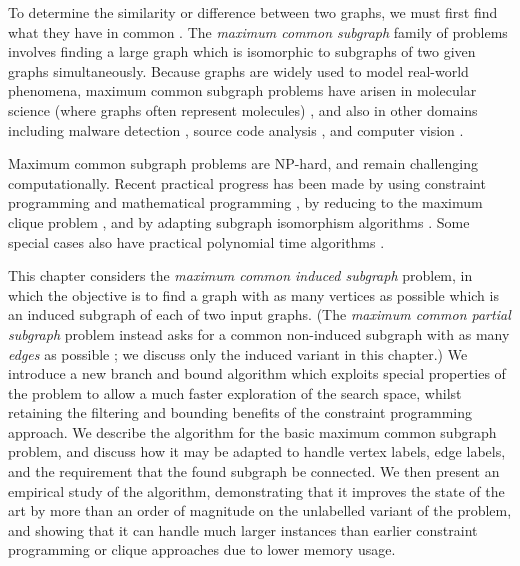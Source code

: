 To determine the similarity or difference between two graphs, we must first
find what they have in common
\citep{DBLP:journals/prl/Bunke97,DBLP:journals/prl/FernandezV01,KriegeThesis}.
The \emph{maximum common subgraph} family of problems involves finding a large
graph which is isomorphic to subgraphs of two given graphs simultaneously.
Because graphs are widely used to model real-world phenomena, maximum common
subgraph problems have arisen in molecular science (where graphs often represent
molecules)
\citep{DBLP:journals/jcamd/RaymondW02a,Ehrlich:2011,DAM2014,Grindley1993707},
and also in other domains including malware detection
\citep{DBLP:journals/compsec/ParkRS13}, source code analysis
\cite{DBLP:journals/tkde/DjokoCH97}, and computer vision
\cite{DBLP:journals/jair/CookH94}.

Maximum common subgraph problems are NP-hard, and remain challenging
computationally. Recent practical progress has been made by using constraint
programming \citep{DBLP:conf/mco/VismaraV08,DBLP:conf/cp/NdiayeS11,DBLP:conf/cp/McCreeshNPS16} and
mathematical programming \citep{DBLP:journals/dam/BahienseMPS12}, by reducing
to the maximum clique problem \citep{LeviG,DBLP:conf/cp/McCreeshNPS16}, and by
adapting subgraph isomorphism algorithms \citep{UpcomingAAAIPaper}. Some
special cases also have practical polynomial time algorithms
\citep{DBLP:conf/mfcs/DroschinskyKM16,DBLP:conf/sofsem/DroschinskyKM17}.

This chapter considers the \emph{maximum common induced subgraph} problem, in
which the objective is to find a graph with as many vertices as possible which
is an induced subgraph of each of two input graphs.  (The \emph{maximum common
partial subgraph} problem instead asks for a common non-induced subgraph with
as many \emph{edges} as possible \citep{DBLP:conf/cp/NdiayeS11}; we discuss
only the induced variant in this chapter.) We introduce
a new branch and bound algorithm which exploits special properties of the
problem to allow a much faster exploration of the search space, whilst
retaining the filtering and bounding benefits of the constraint programming
approach. We describe the algorithm for the basic maximum common subgraph
problem, and discuss how it may be adapted to handle vertex labels, edge
labels, and the requirement that the found subgraph be connected. We then
present an empirical study of the algorithm, demonstrating that it improves the
state of the art by more than an order of magnitude on the unlabelled variant
of the problem, and showing that it can handle much larger instances than
earlier constraint programming or clique approaches due to lower memory usage.

